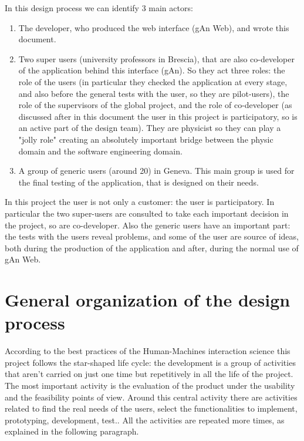 In this design process we can identify 3 main actors: 
\begin{enumerate}

\item
The developer, who produced the web interface (gAn Web), and wrote this document.

\item 
Two super users (university professors in Brescia), that are also co-developer of the application behind this interface (gAn). So they act three roles: the role of the users (in particular they checked the application at every stage, and also before the general tests with the user, so they are pilot-users), the role of the supervisors of the global project, and the role of co-developer (as discussed after in this document the user in this project is participatory, so is an active part of the design team). 
They are physicist so they can play a "jolly role" creating an absolutely important bridge between the physic domain and the software engineering domain. 

\item A group of generic users (around 20) in Geneva. This main group is used for the final testing of the application, that is designed on their needs.
 
\end{enumerate}

In this project the user is not only a customer: the user is participatory. In particular the two super-users are consulted to take each important decision in the project, so are co-developer. Also the generic users have an important part: the tests with the users reveal problems, and some of the user are source of ideas, both during the production of the application and after, during the normal use of gAn Web.

\section{General organization of the design process }
According to the best practices of the Human-Machines interaction science this project follows the star-shaped life cycle: the development is a group of activities that aren't carried on just one time but repetitively in all the life of the project. The most important activity is the evaluation of the product under the usability and the feasibility points of view. Around this central activity there are activities related to find the real needs of the users, select the functionalities to implement, prototyping, development, test.. All the activities are repeated more times, as explained in the following paragraph.    

